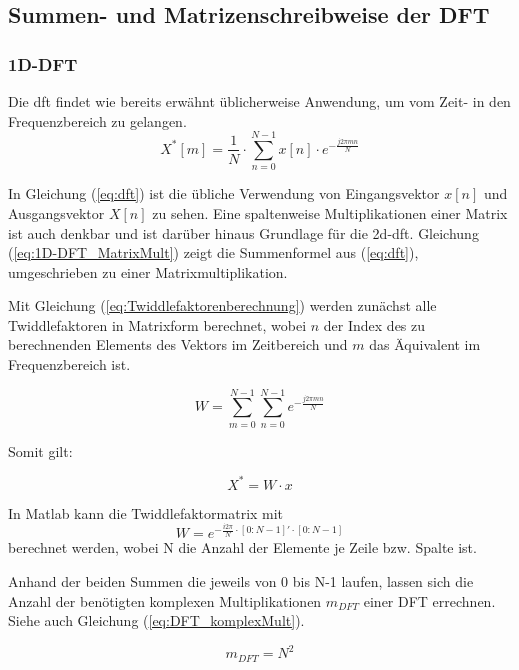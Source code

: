 \subsection{Summen- und Matrizenschreibweise der DFT}\label{sec:SummenMatrizenDFT}
\subsubsection{1D-DFT}
Die \gls{dft} findet wie bereits erwähnt üblicherweise Anwendung, um vom Zeit- in den Frequenzbereich zu gelangen.
\begin{equation}\label{eq:dft}
 X^* \left[ m \right] = \frac{1}{N} \cdot \sum^{N-1}_{n=0} x[n] \cdot e^{-\frac{j 2 \pi m n}{N}}
\end{equation}


In Gleichung (\ref{eq:dft}) ist die übliche Verwendung von Eingangsvektor $x[n]$ und Ausgangsvektor $X[n]$ zu sehen. Eine spaltenweise Multiplikationen einer Matrix
ist auch denkbar und ist darüber hinaus Grundlage für die \gls{2d-dft}.
Gleichung (\ref{eq:1D-DFT_MatrixMult}) zeigt die Summenformel aus (\ref{eq:dft}), umgeschrieben zu einer Matrixmultiplikation.

Mit Gleichung (\ref{eq:Twiddlefaktorenberechnung}) werden zunächst alle Twiddlefaktoren in Matrixform berechnet, wobei $n$ der Index des zu berechnenden Elements des 
Vektors im Zeitbereich und $m$ das Äquivalent im Frequenzbereich ist.

\begin{equation}\label{eq:Twiddlefaktorenberechnung}
W = \sum^{N-1 }_{m=0} \sum^{N-1 }_{n=0} e^{-\frac{j 2 \pi m n}{N}}
\end{equation}


Somit gilt:

\begin{equation}\label{eq:1D-DFT_MatrixMult}
X^* = W \cdot x
\end{equation}

In Matlab kann die Twiddlefaktormatrix mit
\begin{equation}\label{eq:matlab_dft_faktoren}
 W = e^{-\frac{i 2 \pi}{N}\cdot[0:N-1]'\cdot[0:N-1]}
\end{equation}
berechnet werden, wobei N die Anzahl der Elemente je Zeile bzw. Spalte ist.

Anhand der beiden Summen die jeweils von 0 bis N-1 laufen, lassen sich die Anzahl der benötigten komplexen Multiplikationen $m_{DFT}$ einer DFT errechnen. Siehe auch Gleichung 
(\ref{eq:DFT_komplexMult}).

\begin{equation}\label{eq:DFT_komplexMult}
 m_{DFT} = N^2
\end{equation}


